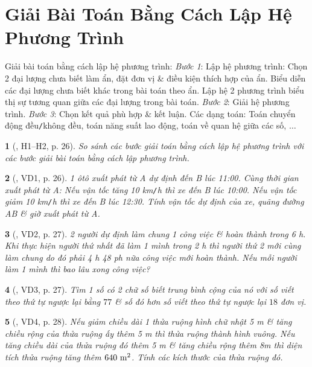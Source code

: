 \documentclass{article}
\newtheorem{baitoan}{}
\begin{document}
\section{Giải Bài Toán Bằng Cách Lập Hệ Phương Trình}
 {\sf Giải bài toán bằng cách lập hệ phương trình:} \textit{Bước 1}: Lập hệ phương trình: Chọn 2 đại lượng chưa biết làm ẩn, đặt đơn vị \& điều kiện thích hợp của ẩn. Biểu diễn các đại lượng chưa biết khác trong bài toán theo ẩn. Lập hệ 2 phương trình biểu thị sự tương quan giữa các đại lượng trong bài toán. \textit{Bước 2}: Giải hệ phương trình. \textit{Bước 3}: Chọn kết quả phù hợp \& kết luận.  Các dạng toán: Toán chuyển động đều{\tt/}không đều, toán năng suất lao động, toán về quan hệ giữa các số, $\ldots$

\begin{baitoan}[\cite{Binh_boi_duong_Toan_9_tap_2}, H1--H2, p. 26]
	So sánh các bước giải toán bằng cách lập hệ phương trình với các bước giải bài toán bằng cách lập phương trình.
\end{baitoan}

\begin{baitoan}[\cite{Binh_boi_duong_Toan_9_tap_2}, VD1, p. 26]
	1 ôtô xuất phát từ A dự định đến B lúc {\rm11:00}. Cùng thời gian xuất phát từ A: Nếu vận tốc tăng {\rm10 km{\tt/}h} thì xe đến B lúc {\rm10:00}. Nếu vận tốc giảm {\rm10 km{\tt/}h} thì xe đến B lúc {\rm12:30}. Tính vận tốc dự định của xe, quãng đường AB \& giờ xuất phát từ A.
\end{baitoan}

\begin{baitoan}[\cite{Binh_boi_duong_Toan_9_tap_2}, VD2, p. 27]
	2 người dự định làm chung 1 công việc \& hoàn thành trong {\rm6 h}. Khi thực hiện người thứ nhất đã làm 1 mình trong {\rm2 h} thì người thứ 2 mới cùng làm chung do đó phải {\rm4 h 48 ph} nữa công việc mới hoàn thành. Nếu mỗi người làm 1 mình thì bao lâu xong công việc?
\end{baitoan}

\begin{baitoan}[\cite{Binh_boi_duong_Toan_9_tap_2}, VD3, p. 27]
	Tìm 1 số có 2 chữ số biết trung bình cộng của nó với số viết theo thứ tự ngược lại bằng $77$ \& số đó hơn số viết theo thứ tự ngược lại $18$ đơn vị.
\end{baitoan}

\begin{baitoan}[\cite{Binh_boi_duong_Toan_9_tap_2}, VD4, p. 28]
	Nếu giảm chiều dài 1 thửa ruộng hình chữ nhật {\rm5 m} \& tăng chiều rộng của thửa ruộng ấy thêm {\rm5 m} thì thửa ruộng thành hình vuông. Nếu tăng chiều dài của thửa ruộng đó thêm {\rm5 m} \& tăng chiều rộng thêm {\rm 8m} thì diện tích thửa ruộng tăng thêm $\rm640\ m^2$. Tính các kích thước của thửa ruộng đó.
\end{baitoan}
\end{document}

